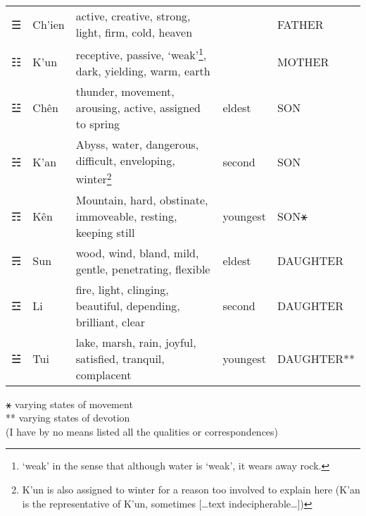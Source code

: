 \documentclass[11pt]{book}
\begin{document}
\begin{longtable}[]{@{}
  >{\raggedleft\arraybackslash}p{}
  >{\centering\arraybackslash}p{}
  >{\raggedright\arraybackslash}p{}
  >{\raggedleft\arraybackslash}p{}
  >{\raggedright\arraybackslash}p{}@{}}
\toprule
\endhead
☰ & Ch'ien & active, creative, strong, light, firm, cold, heaven & & FATHER \\
☷ & K'un & receptive, passive, `weak'\footnote{`weak' in the sense that although water is `weak', it wears away rock.}, dark, yielding, warm, earth & & MOTHER \\
☳ & Chên & thunder, movement, arousing, active, assigned to spring & eldest & SON \\
☵ & K'an & Abyss, water, dangerous, difficult, enveloping, winter\footnote{K'un is also assigned to winter for a reason too involved to explain here (K'an is the representative of K'un, sometimes {[}\ldots text indecipherable\ldots{]})} & second & SON \\
☶ & Kên & Mountain, hard, obstinate, immoveable, resting, keeping still & youngest & SON⚹ \\
☴ & Sun & wood, wind, bland, mild, gentle, penetrating, flexible & eldest & DAUGHTER \\
☲ & Li & fire, light, clinging, beautiful, depending, brilliant, clear & second & DAUGHTER \\
☱ & Tui & lake, marsh, rain, joyful, satisfied, tranquil, complacent & youngest & DAUGHTER** \\
\bottomrule
\end{longtable}

⚹ varying states of movement\\
** varying states of devotion\\
(I have by no means listed all the qualities or correspondences)
\end{document}
